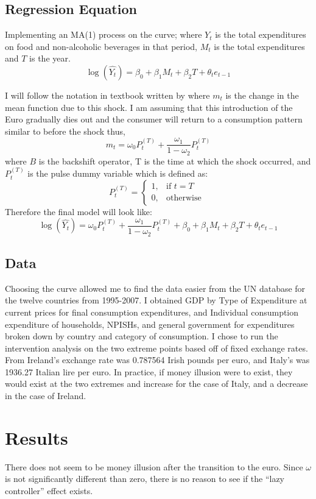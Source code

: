 \documentclass{paper}
\begin{document}
\subsection{Regression Equation}
Implementing an MA(1) process on the curve; where $Y_{t}$ is the total expenditures on food and non-alcoholic beverages in that period, $M_{t}$ is the total expenditures and $T$ is the year.  
$$\log(\hat{Y_{t}}) = \beta_{0} + \beta_{1}M_{t} + \beta_{2}T  + \theta_{t}e_{t-1}$$

 I will follow the notation in textbook written by \cite{cryechan2008} where $m_{t}$ is the change in the mean function due to this shock. I am assuming that this introduction of the Euro gradually dies out and the consumer will return to a consumption pattern similar to before the shock thus, $$m_{t} = \omega_{0}P^{(T)}_{t} + \frac{\omega_{1}}{1-\omega_{2}}P^{(T)}_{t}$$
where $B$ is the backshift operator, T is the time at which the shock occurred, and $P_{t}^{(T)}$ is the pulse dummy variable which is defined as: 
$$
P_{t}^{(T)} =
\begin{cases}
    1, & \text{if } t = T \\
    0, & \text{otherwise }
  \end{cases}
$$
Therefore the final model will look like:
$$\log(\hat{Y_{t}}) = \omega_{0}P^{(T)}_{t} + \frac{\omega_{1}}{1-\omega_{2}}P^{(T)}_{t}+ \beta_{0} + \beta_{1}M_{t} + \beta_{2}T  + \theta_{t}e_{t-1}$$

\subsection{Data}
Choosing the curve allowed me to find the data easier from the UN database for the twelve countries from 1995-2007. I obtained GDP by Type of Expenditure at current prices for final consumption expenditures, and Individual consumption expenditure of households, NPISHs, and general government for expenditures broken down by country and category of consumption. I chose to run the intervention analysis on the two extreme points based off of fixed exchange rates. From \cite{schrsuyk2002} Ireland's exchange rate was 0.787564 Irish pounds per euro, and Italy's was 1936.27 Italian lire per euro. In practice, if money illusion were to exist, they would exist at the two extremes and increase for the case of Italy, and a decrease in the case of Ireland.

\section{Results}
There does not seem to be money illusion after the transition to the euro. Since $\omega$ is not significantly different than zero, there is no reason to see if the ``lazy controller'' effect exists.  
\end{document}
